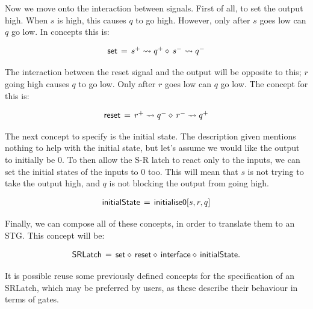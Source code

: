 \documentclass[british, journal]{IEEEtran}
\begin{document}
Now we move onto the interaction between signals. First of all, to set the output high.
When $s$ is high, this causes $q$ to go high. However, only after $s$ goes low can $q$ go low.
In concepts this is: 

\[
\begin{array}{lcl}
\mathsf{set}&\hspace{-2mm}=&\hspace{-2mm}s^{+} \rightsquigarrow q^{+} \diamond\, s^{-} \rightsquigarrow q^{-}
\end{array}
\]

The interaction between the reset signal and the output will be opposite to this; $r$ going high causes $q$ 
to go low. Only after $r$ goes low can $q$ go low. The concept for this is:

\[
\begin{array}{lcl}
\mathsf{reset}&\hspace{-2mm}=&\hspace{-2mm}r^{+} \rightsquigarrow q^{-} \diamond\, r^{-} \rightsquigarrow q^{+}
\end{array}
\]

The next concept to specify is the initial state. The description given mentions nothing
to help with the initial state, but let's assume we would like the output to initially be 0. 
To then allow the S-R latch to react only to the inputs, we can set the initial states of the 
inputs to 0 too. This will mean that $s$ is not trying to take the output high, and $q$ is not
blocking the output from going high. 

\[
\begin{array}{lcl}
\mathsf{initialState}&\hspace{-2mm}=&\hspace{-2mm}\mathsf{initialise0} [s, r, q]
\end{array}
\]

Finally, we can compose all of these concepts, in order to translate them to an STG. This concept will be:

\[
\begin{array}{lcl}
\mathsf{SRLatch}&\hspace{-2mm}=&\hspace{-2mm}\mathsf{set} \diamond\, \mathsf{reset} \diamond\, \mathsf{interface} 
\diamond\, \mathsf{initialState}.
\end{array}
\]

It is possible reuse some previously defined concepts for the specification of an SRLatch,
which may be preferred by users, as these describe their behaviour in terms of gates.  
\end{document}
